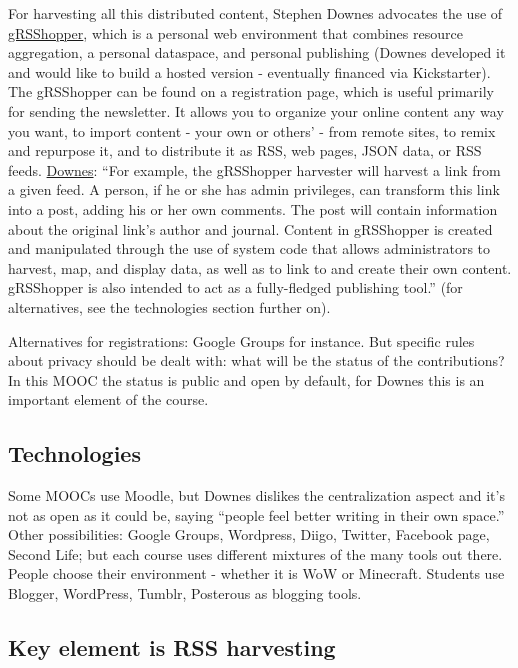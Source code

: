 For harvesting all this distributed content, Stephen Downes advocates
the use of \href{http://grsshopper.downes.ca/index.html}{gRSShopper},
which is a personal web environment that combines resource aggregation,
a personal dataspace, and personal publishing (Downes developed it and
would like to build a hosted version - eventually financed via
Kickstarter). The gRSShopper can be found on a registration page, which
is useful primarily for sending the newsletter. It allows you to
organize your online content any way you want, to import content - your
own or others' - from remote sites, to remix and repurpose it, and to
distribute it as RSS, web pages, JSON data, or RSS feeds.
\href{http://grsshopper.downes.ca/about.htm}{Downes}: ``For example, the
gRSShopper harvester will harvest a link from a given feed. A person, if
he or she has admin privileges, can transform this link into a post,
adding his or her own comments. The post will contain information about
the original link's author and journal. Content in gRSShopper is created
and manipulated through the use of system code that allows
administrators to harvest, map, and display data, as well as to link to
and create their own content. gRSShopper is also intended to act as a
fully-fledged publishing tool.'' (for alternatives, see the technologies
section further on).

Alternatives for registrations: Google Groups for instance. But specific
rules about privacy should be dealt with: what will be the status of the
contributions? In this MOOC the status is public and open by default,
for Downes this is an important element of the course.

\subsection{Technologies}

Some MOOCs use Moodle, but Downes dislikes the centralization aspect and
it's not as open as it could be, saying ``people feel better writing in
their own space.'' Other possibilities: Google Groups, Wordpress, Diigo,
Twitter, Facebook page, Second Life; but each course uses different
mixtures of the many tools out there. People choose their environment -
whether it is WoW or Minecraft. Students use Blogger, WordPress, Tumblr,
Posterous as blogging tools.

\subsection{Key element is RSS harvesting}

